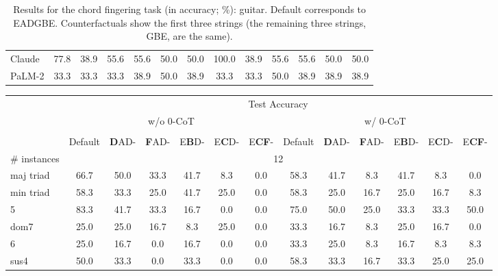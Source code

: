 \begin{table}[t!]
\begin{tabular}{lcccccccccccc}
    Claude & \phantom{0}77.8 & \phantom{0}38.9 & 55.6 & 55.6 & \phantom{0}50.0 & 50.0 & 100.0 & \phantom{0}38.9 & \phantom{0}55.6 & \phantom{0}55.6 & \phantom{0}50.0 & \phantom{0}50.0 \\
    PaLM-2 & \phantom{0}33.3 & \phantom{0}33.3 & 33.3 & 38.9 & \phantom{0}50.0 & 38.9 & \phantom{0}33.3 & \phantom{0}33.3 & \phantom{0}50.0 & \phantom{0}38.9 & \phantom{0}38.9 & \phantom{0}38.9 \\
    \bottomrule
    \end{tabular}
    \caption{Results for the chord fingering task (in accuracy; \%): guitar. Default corresponds to EADGBE. Counterfactuals show the first three strings (the remaining three strings, GBE, are the same).
    }
\end{table}

\begin{table}[t!]
    \centering
    \footnotesize
    \begin{tabular}{lcccccccccccc}
    \toprule 
     & \multicolumn{12}{c}{Test Accuracy} \\ \cmidrule(lr){2-13}
     & \multicolumn{6}{c}{w/o 0-CoT} & \multicolumn{6}{c}{w/ 0-CoT} \\
     \cmidrule(lr){2-7} \cmidrule(lr){8-13} \\
     & Default & \textbf{D}AD- & \textbf{F}AD- & E\textbf{B}D- & E\textbf{C}D- & E\textbf{CF}- & Default & \textbf{D}AD- & \textbf{F}AD- & E\textbf{B}D- & E\textbf{C}D- & E\textbf{CF}- \\
     \midrule
     \# instances & \multicolumn{12}{c}{12} \\
    \midrule
    maj triad & 66.7 & 50.0 & 33.3 & 41.7 & \phantom{0}8.3 & \phantom{0}0.0 & 58.3 & 41.7 & \phantom{0}8.3 & 41.7 & \phantom{0}8.3 & \phantom{0}0.0 \\
    min triad & 58.3 & 33.3 & 25.0 & 41.7 & 25.0 & \phantom{0}0.0 & 58.3 & 25.0 & 16.7 & 25.0 & 16.7 & \phantom{0}8.3 \\
    5 & 83.3 & 41.7 & 33.3 & 16.7 & \phantom{0}0.0 & \phantom{0}0.0 & 75.0 & 50.0 & 25.0 & 33.3 & 33.3 & 50.0 \\
    dom7 & 25.0 & 25.0 & 16.7 & \phantom{0}8.3 & 25.0 & \phantom{0}0.0 & 33.3 & 16.7 & \phantom{0}8.3 & 25.0 & 16.7 & \phantom{0}0.0 \\
    6 & 25.0 & 16.7 & \phantom{0}0.0 & 16.7 & \phantom{0}0.0 & \phantom{0}0.0 & 33.3 & 25.0 & \phantom{0}8.3 & 16.7 & \phantom{0}8.3 & \phantom{0}8.3 \\
    sus4 & 50.0 & 33.3 & \phantom{0}0.0 & 33.3 & \phantom{0}0.0 & \phantom{0}0.0 & 58.3 & 33.3 & 16.7 & 33.3 & 25.0 & 25.0 \\

\end{tabular}
\end{table}
